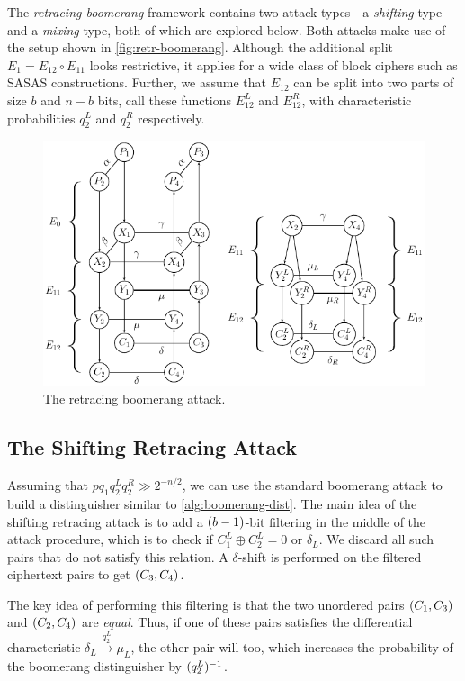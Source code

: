 \documentclass[twoside]{article}
\begin{document}
The \emph{retracing boomerang} framework contains two attack types - a
\emph{shifting} type and a \emph{mixing} type, both of which are explored below.
Both attacks make use of the setup shown in \autoref{fig:retr-boomerang}.
Although the additional split \(E_1 = E_{12} \circ E_{11}\) looks restrictive,
it applies for a wide class of block ciphers such as SASAS constructions.
Further, we assume that \(E_12\) can be split into two parts of size \(b\) and
\(n - b\) bits, call these functions \(E_{12}^L\) and \(E_{12}^R\), with
characteristic probabilities \(q_2^L\) and \(q_2^R\) respectively.

\begin{figure}[!ht]
    \centering
    \includegraphics[width=0.6\columnwidth]{images/retracing_boomerang.png}
    \caption{The retracing boomerang attack.}
    \label{fig:retr-boomerang}
\end{figure}

\subsection{The Shifting Retracing Attack}

Assuming that \(pq_1q_2^Lq_2^R \gg 2^{-n/2}\), we can use the standard boomerang
attack to build a distinguisher similar to \autoref{alg:boomerang-dist}. The
main idea of the shifting retracing attack is to add a \((b - 1)\)-bit
filtering in the middle of the attack procedure, which is to check if \(C_1^L
\oplus C_2^L = 0 \textrm{ or } \delta_L\). We discard all such pairs that do not
satisfy this relation. A \(\delta\)-shift is performed on the filtered
ciphertext pairs to get \((C_3, C_4)\).

The key idea of performing this filtering is that the two unordered pairs
\((C_1, C_3)\) and \((C_2, C_4)\) are \emph{equal}. Thus, if one of
these pairs satisfies the differential characteristic \(\delta_L
\xrightarrow{q_2^L} \mu_L\), the other pair will too, which increases the
probability of the boomerang distinguisher by \((q_2^L)^{-1}\).
\end{document}
